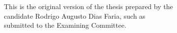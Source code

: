 \documentclass[12pt,twoside,a4paper]{book}
\theoremstyle{plain}
\theoremstyle{definition}
\begin{document}
    \vskip 2cm

    \begin{flushright}
	This is the original version of the thesis prepared by the \\
	candidate Rodrigo Augusto Dias Faria, such as \\
	submitted to the Examining Committee.
    \end{flushright}

\pagebreak


%
%
%
%





    
      
\end{document}
